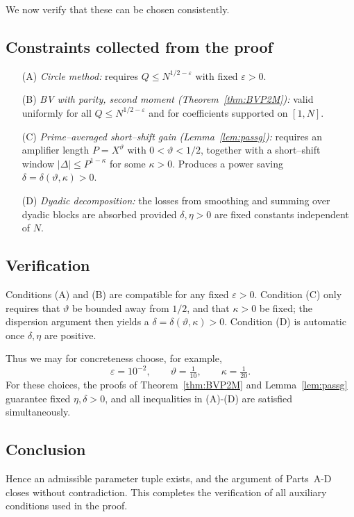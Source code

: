 \documentclass[11pt]{article}
\theoremstyle{definition}
\theoremstyle{remark}
\numberwithin{equation}{part}
\begin{document}
We now verify that these can be chosen consistently.

\subsection*{Constraints collected from the proof}
\begin{enumerate}
	\item[(A)] \emph{Circle method:} requires $Q\le N^{1/2-\varepsilon}$ with fixed $\varepsilon>0$.
	\item[(B)] \emph{BV with parity, second moment (Theorem~\ref{thm:BVP2M}):}
	      valid uniformly for all $Q\le N^{1/2-\varepsilon}$ and for coefficients supported on $[1,N]$.
	\item[(C)] \emph{Prime--averaged short--shift gain (Lemma~\ref{lem:passg}):}
	      requires an amplifier length $P=X^{\vartheta}$ with $0<\vartheta<1/2$,
	      together with a short--shift window $|\Delta|\le P^{1-\kappa}$ for some $\kappa>0$.
	      Produces a power saving $\delta=\delta(\vartheta,\kappa)>0$.
	\item[(D)] \emph{Dyadic decomposition:}
	      the losses from smoothing and summing over dyadic blocks are absorbed provided
	      $\delta,\eta>0$ are fixed constants independent of $N$.
\end{enumerate}

\subsection*{Verification}
Conditions (A) and (B) are compatible for any fixed $\varepsilon>0$.
Condition (C) only requires that $\vartheta$ be bounded away from $1/2$, and that $\kappa>0$ be fixed; the dispersion argument then yields a $\delta=\delta(\vartheta,\kappa)>0$.
Condition (D) is automatic once $\delta,\eta$ are positive.

Thus we may for concreteness choose, for example,
\[
	\varepsilon = 10^{-2},\qquad
	\vartheta = \tfrac{1}{10},\qquad
	\kappa = \tfrac{1}{20}.
\]
For these choices, the proofs of Theorem~\ref{thm:BVP2M} and Lemma~\ref{lem:passg} guarantee fixed $\eta,\delta>0$, and all inequalities in (A)-(D) are satisfied simultaneously.

\subsection*{Conclusion}
Hence an admissible parameter tuple exists, and the argument of Parts~A-D closes without contradiction.
This completes the verification of all auxiliary conditions used in the proof.
\end{document}
